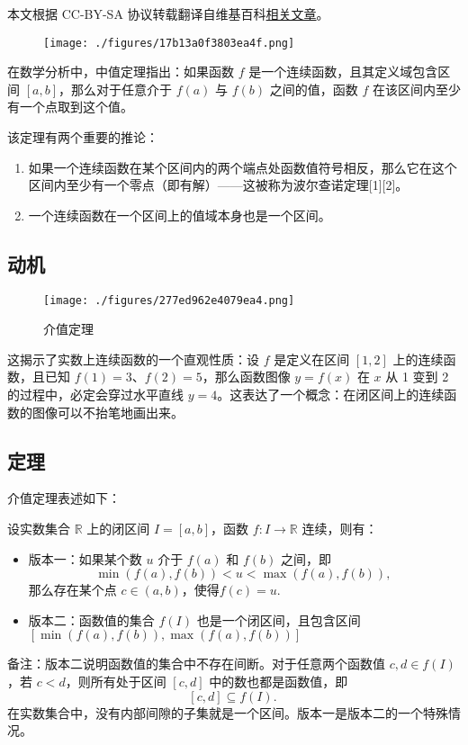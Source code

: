 
本文根据 CC-BY-SA 协议转载翻译自维基百科\href{https://en.wikipedia.org/wiki/Intermediate_value_theorem}{相关文章}。

\begin{figure}[ht]
\centering
\texttt{[image: ./figures/17b13a0f3803ea4f.png]}
\caption{} \label{fig_JZDL_1}
\end{figure}
在数学分析中，中值定理指出：如果函数 $f$ 是一个连续函数，且其定义域包含区间 $[a, b]$，那么对于任意介于 $f(a)$ 与 $f(b)$ 之间的值，函数 $f$ 在该区间内至少有一个点取到这个值。

该定理有两个重要的推论：
\begin{enumerate}
\item 如果一个连续函数在某个区间内的两个端点处函数值符号相反，那么它在这个区间内至少有一个零点（即有解）——这被称为波尔查诺定理[1][2]。
\item 一个连续函数在一个区间上的值域本身也是一个区间。
\end{enumerate}
\subsection{动机}
\begin{figure}[ht]
\centering
\texttt{[image: ./figures/277ed962e4079ea4.png]}
\caption{介值定理} \label{fig_JZDL_2}
\end{figure}
这揭示了实数上连续函数的一个直观性质：设 $f$ 是定义在区间 $[1, 2]$ 上的连续函数，且已知 $f(1) = 3$、$f(2) = 5$，那么函数图像 $y = f(x)$ 在 $x$ 从 1 变到 2 的过程中，必定会穿过水平直线 $y = 4$。这表达了一个概念：在闭区间上的连续函数的图像可以不抬笔地画出来。
\subsection{定理}
介值定理表述如下：

设实数集合 $\mathbb{R}$ 上的闭区间 $I = [a, b]$，函数 $f: I \to \mathbb{R}$ 连续，则有：

\begin{itemize}
\item 版本一：如果某个数 $u$ 介于 $f(a)$ 和 $f(b)$ 之间，即
$$
\min(f(a), f(b)) < u < \max(f(a), f(b)),~
$$
那么存在某个点 $c \in (a, b)$，使得$f(c) = u$.
\item 版本二：函数值的集合 $f(I)$ 也是一个闭区间，且包含区间$[\min(f(a), f(b)), \max(f(a), f(b))]$
\end{itemize}
备注：版本二说明函数值的集合中不存在间断。对于任意两个函数值 $c, d \in f(I)$，若 $c < d$，则所有处于区间 $[c, d]$ 中的数也都是函数值，即
$$
[c, d] \subseteq f(I).~
$$
在实数集合中，没有内部间隙的子集就是一个区间。版本一是版本二的一个特殊情况。
